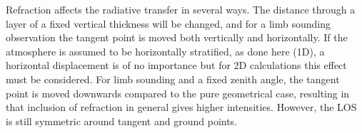   

  \label{sec:los:refraction}
  
  Refraction affects the radiative transfer in several ways. The
  distance through a layer of a fixed vertical thickness will be
  changed, and for a limb sounding observation the tangent point is
  moved both vertically and horizontally. If the atmosphere is assumed
  to be horizontally stratified, as done here (1D), a horizontal
  displacement is of no importance but for 2D calculations this effect
  must be considered. For limb sounding and a fixed zenith angle, the
  tangent point is moved downwards compared to the pure geometrical
  case, resulting in that inclusion of refraction in general gives
  higher intensities. However, the LOS is still symmetric around
  tangent and ground points.

  \label{sec:los:reftheory}

